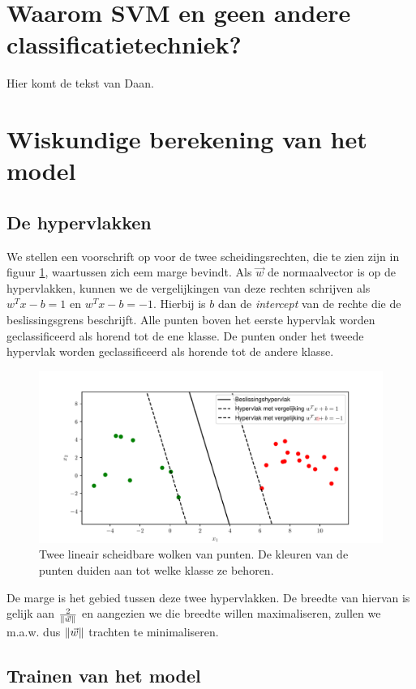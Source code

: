 \documentclass[TeamE-eindrapport]{subfiles}
\begin{document}
\section{Waarom SVM en geen andere classificatietechniek?}

Hier komt de tekst van Daan.

\section{Wiskundige berekening van het model}

\subsection{De hypervlakken}

We stellen een voorschrift op voor de twee scheidingsrechten, die te zien zijn in figuur \ref{fig:svm}, waartussen zich eem marge bevindt. Als \(\vec{w}\) de normaalvector is op de hypervlakken, kunnen we de vergelijkingen van deze rechten schrijven als \(w^Tx-b=1\) en \(w^Tx-b=-1\). Hierbij is \(b\) dan de \textit{intercept} van de rechte die de beslissingsgrens beschrijft. Alle punten boven het eerste hypervlak worden geclassificeerd als horend tot de ene klasse. De punten onder het tweede hypervlak worden geclassificeerd als horende tot de andere klasse.

\begin{figure}[h!]
	\centering
	\includegraphics[width=.7\textwidth]{svm}
	\caption{Twee lineair scheidbare wolken van punten. De kleuren van de punten duiden aan tot welke klasse ze behoren.}
	\label{fig:svm}
\end{figure}

De marge is het gebied tussen deze twee hypervlakken. De breedte van hiervan is gelijk aan \(\frac{2}{\left\| \vec{w} \right\|}\) en aangezien we die breedte willen maximaliseren, zullen we m.a.w. dus \(\left\| \vec{w} \right\|\) trachten te minimaliseren.

\subsection{Trainen van het model}
\end{document}
